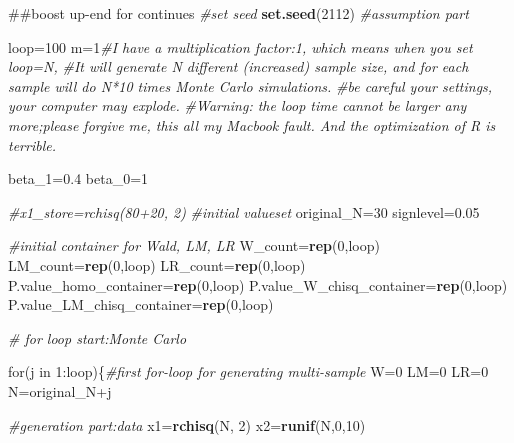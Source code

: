 \documentclass[]{article}
\newenvironment{Shaded}{\begin{snugshade}}{\end{snugshade}}
\newcommand{\KeywordTok}[1]{\textcolor[rgb]{0.13,0.29,0.53}{\textbf{{#1}}}}
\newcommand{\DecValTok}[1]{\textcolor[rgb]{0.00,0.00,0.81}{{#1}}}
\newcommand{\FloatTok}[1]{\textcolor[rgb]{0.00,0.00,0.81}{{#1}}}
\newcommand{\CommentTok}[1]{\textcolor[rgb]{0.56,0.35,0.01}{\textit{{#1}}}}
\newcommand{\NormalTok}[1]{{#1}}
\begin{document}
\begin{Shaded}
\begin{Highlighting}[]
\NormalTok{##boost up-end for continues}
\CommentTok{#set seed}
\KeywordTok{set.seed}\NormalTok{(}\DecValTok{2112}\NormalTok{)}
\CommentTok{#assumption part}

\NormalTok{loop=}\DecValTok{100}
\NormalTok{m=}\DecValTok{1}\CommentTok{#I have a multiplication factor:1, which means when you set loop=N, }
\CommentTok{#It will generate N different (increased) sample size, and for each sample will do N*10 times Monte Carlo simulations.}
\CommentTok{#be careful your settings, your computer may explode.}
\CommentTok{#Warning: the loop time cannot be larger any more;please forgive me, this all my Macbook fault. And the optimization of R is terrible.}

\NormalTok{beta_1=}\FloatTok{0.4}
\NormalTok{beta_0=}\DecValTok{1}

\CommentTok{#x1_store=rchisq(80+20, 2)}
\CommentTok{#initial valueset}
\NormalTok{original_N=}\DecValTok{30}
\NormalTok{signlevel=}\FloatTok{0.05}

\CommentTok{#initial container for Wald, LM, LR}
\NormalTok{W_count=}\KeywordTok{rep}\NormalTok{(}\DecValTok{0}\NormalTok{,loop)}
\NormalTok{LM_count=}\KeywordTok{rep}\NormalTok{(}\DecValTok{0}\NormalTok{,loop)}
\NormalTok{LR_count=}\KeywordTok{rep}\NormalTok{(}\DecValTok{0}\NormalTok{,loop)}
\NormalTok{P.value_homo_container=}\KeywordTok{rep}\NormalTok{(}\DecValTok{0}\NormalTok{,loop)}
\NormalTok{P.value_W_chisq_container=}\KeywordTok{rep}\NormalTok{(}\DecValTok{0}\NormalTok{,loop)}
\NormalTok{P.value_LM_chisq_container=}\KeywordTok{rep}\NormalTok{(}\DecValTok{0}\NormalTok{,loop)}

\CommentTok{# for loop start:Monte Carlo}

\NormalTok{for(j in }\DecValTok{1}\NormalTok{:loop)\{}\CommentTok{#first for-loop for generating multi-sample}
\NormalTok{W=}\DecValTok{0}
\NormalTok{LM=}\DecValTok{0}
\NormalTok{LR=}\DecValTok{0}
\NormalTok{N=original_N+j}

\CommentTok{#generation part:data}
\NormalTok{x1=}\KeywordTok{rchisq}\NormalTok{(N, }\DecValTok{2}\NormalTok{)}
\NormalTok{x2=}\KeywordTok{runif}\NormalTok{(N,}\DecValTok{0}\NormalTok{,}\DecValTok{10}\NormalTok{)}


\end{Highlighting}
\end{Shaded}
\end{document}
